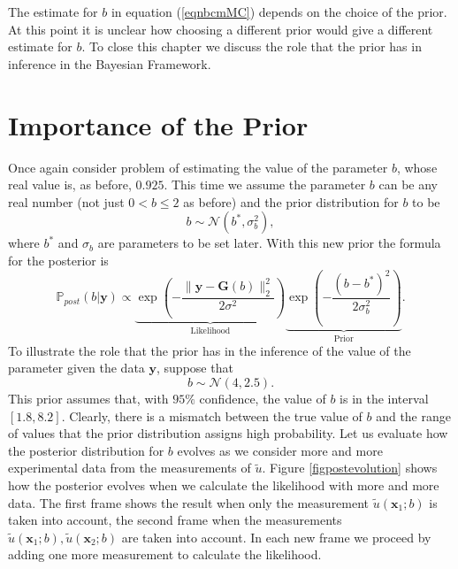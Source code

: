 \documentclass{sfuthesis}
\newcommand{\post}{\mathbb{P}_{post}}
\newcommand{\x}{\textbf{x}}
\begin{document}
The estimate for $b$ in equation (\ref{eqnbcmMC}) depends on the choice of the prior. At this point it is unclear
how choosing a different prior would give a different estimate for $b$.
To close this chapter we discuss  the role that the prior has in inference in the Bayesian Framework.
\section{Importance of the Prior}
Once again  consider  problem of estimating
the value of the parameter $b$, whose real value is, as before, $0.925$. This time we assume the parameter
$b$ can be any real number (not just $0<b\leq 2$ as before) and the  prior distribution for $b$ to be
\begin{equation*}
b\sim\mathscr{N}(b^{*},\sigma_{b}^{2}),
\end{equation*}
where $b^{*}$ and $\sigma_{b}$ are parameters to be set later.  With this new prior the formula
for the posterior is 
\begin{equation*}
\post(b|\textbf{y})\propto\underbrace{\exp\left(-\frac{\|\textbf{y}-\textbf{G}(b)\|_{2}^{2}}{2\sigma^{2}}\right)}_{\text{Likelihood}}\underbrace{\exp\left(-\frac{(b-b^{*})^{2}}{2\sigma_{b}^{2}}\right)}_{\text{Prior}}.
\end{equation*}
To illustrate the role that the prior has in the inference of the value
of the parameter given the data $\textbf{y}$, suppose that 
\begin{equation*}
b\sim\mathscr{N}(4,2.5).
\end{equation*}
This prior assumes that, with $95\%$ confidence, the value of
$b$ is in the interval $[1.8,8.2]$. Clearly, there is a mismatch between
the true value of $b$ and the range of values that the prior distribution
assigns high probability. Let us evaluate how the posterior
distribution for $b$ evolves as we consider more and more experimental
data from the measurements of $\tilde{u}$. Figure \ref{figpostevolution} shows
how the posterior evolves when we calculate the likelihood with more 
and more data. The first frame shows the result when only the measurement
$\tilde{u}(\x_{1};b)$ is taken into account, the second frame
when the measurements $\tilde{u}(\x_{1};b),\tilde{u}(\x_{2};b)$ are taken
into account. In each new frame we proceed by adding one more measurement 
to calculate the likelihood.
\end{document}
